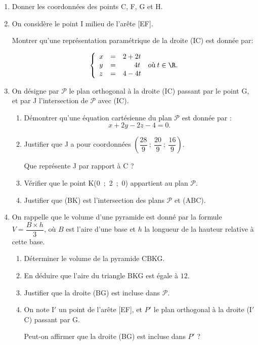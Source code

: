 \begin{enumerate}
\item Donner les coordonnées des points C, F{}, G et H.
\item On considère le point I milieu de l'arête [EF].

Montrer qu'une représentation paramétrique de la droite (IC) est donnée par: 

\[\left\{\begin{array}{l c l}
x &=&2+2t\\
y &=&\phantom{2 +~}4t\\
z &=&4 - 4t
\end{array}\right.\:\text{où} \:  t \in \R.\]

\item On désigne par $\mathcal{P}$ le plan orthogonal à la droite (IC) passant par le point G, et par J l'intersection de $\mathcal{P}$ avec (IC).
	\begin{enumerate}
		\item Démontrer qu'une équation cartésienne du plan $\mathcal{P}$ est donnée par : 
		\[x + 2y - 2z - 4 = 0.\]
		\item Justifier que J a pour coordonnées $\left(\dfrac{28}{9}~;~\dfrac{20}{9}~;~\dfrac{16}{9}\right)$.
		
Que représente J par rapport à C ? 
		\item Vérifier que le point K(0~;~2~;~0) appartient au plan $\mathcal{P}$.
		\item Justifier que (BK) est l'intersection des plans $\mathcal{P}$ et (ABC).
	\end{enumerate}
\item On rappelle que le volume d'une pyramide est donné par la formule $V = \dfrac{B \times h}{3}$, où $B$ est l'aire d'une base et $h$ la longueur de la hauteur relative à cette base.
	\begin{enumerate}
		\item Déterminer le volume de la pyramide CBKG.
		\item En déduire que l'aire du triangle BKG est égale à $12$.
		\item Justifier que la droite (BG) est incluse dans $\mathcal{P}$.
		\item On note I$'$ un point de l'arête [EF], et $P'$ le plan orthogonal à la droite (I$'$ C) passant par G.
		
Peut-on affirmer que la droite (BG) est incluse dans $P'$ ?
	\end{enumerate}
\end{enumerate}

\bigskip
